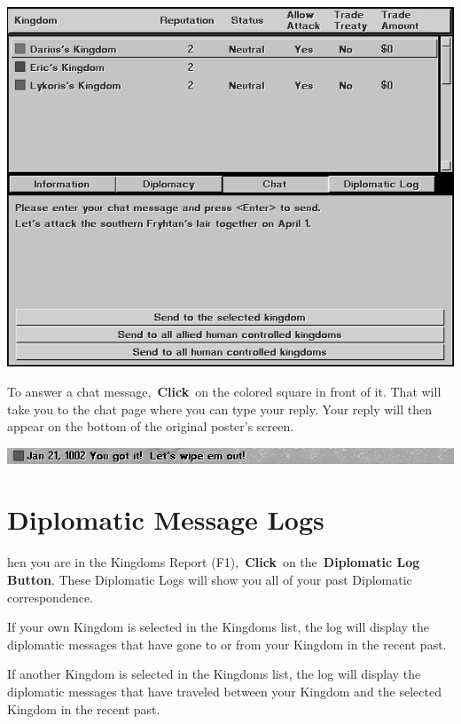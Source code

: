 \begin{center}
	\includegraphics[width=0.9\linewidth]{Imutlichat}
\end{center}

To answer a chat message, \textbf{Click} on the colored square in front of it. That will take you to the chat page where you can type your reply. Your reply will then appear on the bottom of the original poster’s screen.

\begin{center}
	\includegraphics[width=0.7\linewidth]{Imutlichat_message}
\end{center}

\section{Diplomatic Message Logs}


hen you are in the Kingdoms Report (F1), \textbf{Click} on the \textbf{Diplomatic Log Button}. These Diplomatic Logs will show you all of your past Diplomatic correspondence.

If your own Kingdom is selected in the Kingdoms list, the log will display the diplomatic messages that have gone to or from your Kingdom in the recent past.

If another Kingdom is selected in the Kingdoms list, the log will display the diplomatic messages that have traveled between your Kingdom and the selected Kingdom in the recent past.